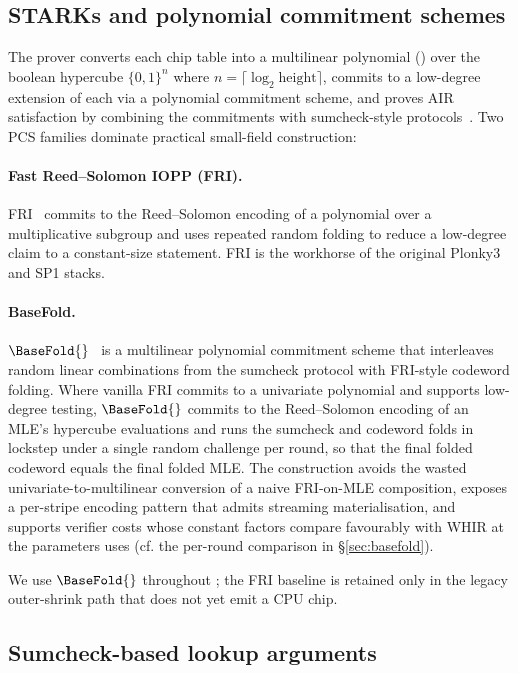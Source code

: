 \subsection{STARKs and polynomial commitment schemes}

The \zkVM{} prover converts each chip table into a multilinear polynomial (\Mle{}) over the boolean hypercube $\{0,1\}^n$ where $n = \lceil \log_2 \text{height}\rceil$, commits to a low-degree extension of each \Mle{} via a polynomial commitment scheme, and proves AIR satisfaction by combining the commitments with sumcheck-style protocols~\citep{lund1992algebraic}. Two PCS families dominate practical small-field \zkVM{} construction:

\paragraph{Fast Reed--Solomon IOPP (FRI).} FRI~\citep{ben2018fast} commits to the Reed--Solomon encoding of a polynomial over a multiplicative subgroup and uses repeated random folding to reduce a low-degree claim to a constant-size statement. FRI is the workhorse of the original Plonky3 and SP1 stacks.

\paragraph{BaseFold.} $\BaseFold{}$~\citep{basefold} is a multilinear polynomial commitment scheme that interleaves random linear combinations from the sumcheck protocol with FRI-style codeword folding. Where vanilla FRI commits to a univariate polynomial and supports low-degree testing, $\BaseFold{}$ commits to the Reed--Solomon encoding of an MLE's hypercube evaluations and runs the sumcheck and codeword folds in lockstep under a single random challenge per round, so that the final folded codeword equals the final folded MLE. The construction avoids the wasted univariate-to-multilinear conversion of a naive FRI-on-MLE composition, exposes a per-stripe encoding pattern that admits streaming materialisation, and supports verifier costs whose constant factors compare favourably with WHIR at the parameters \Zirenver{} uses (cf. the per-round comparison in \S\ref{sec:basefold}).

We use $\BaseFold{}$ throughout \Zirenver{}; the FRI baseline is retained only in the legacy outer-shrink path that does not yet emit a CPU chip.

\subsection{Sumcheck-based lookup arguments}

